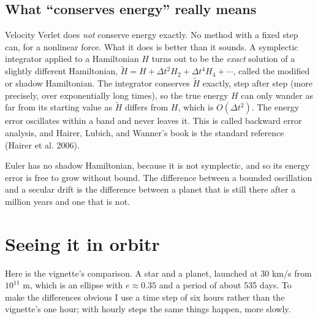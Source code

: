 \documentclass[
  10.5pt,
  letterpaper,
]{scrbook}
\theoremstyle{plain}
\theoremstyle{remark}
\begin{document}
\subsection{What ``conserves energy'' really
means}\label{what-conserves-energy-really-means}

Velocity Verlet does \emph{not} conserve energy exactly. No method with
a fixed step can, for a nonlinear force. What it does is better than it
sounds. A symplectic integrator applied to a Hamiltonian \(H\) turns out
to be the \emph{exact} solution of a slightly different Hamiltonian,
\(\tilde H = H + \Delta t^2 H_2 + \Delta t^4 H_4 + \cdots\), called the
modified or shadow Hamiltonian. The integrator conserves \(\tilde H\)
exactly, step after step (more precisely, over exponentially long
times), so the true energy \(H\) can only wander as far from its
starting value as \(\tilde H\) differs from \(H\), which is
\(O(\Delta t^2)\). The energy error oscillates within a band and never
leaves it. This is called backward error analysis, and Hairer, Lubich,
and Wanner's book is the standard reference (Hairer et al. 2006).

Euler has no shadow Hamiltonian, because it is not symplectic, and so
its energy error is free to grow without bound. The difference between a
bounded oscillation and a secular drift is the difference between a
planet that is still there after a million years and one that is not.

\section{Seeing it in orbitr}\label{seeing-it-in-orbitr}

Here is the vignette's comparison. A star and a planet, launched at 30
km/s from \(10^{11}\) m, which is an ellipse with \(e \approx 0.35\) and
a period of about 535 days. To make the differences obvious I use a time
step of six hours rather than the vignette's one hour; with hourly steps
the same things happen, more slowly.
\end{document}
